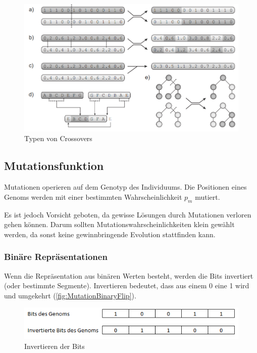         \begin{figure}[H]
          \includegraphics[width=\textwidth,center]{graphics/crossover_types}
          \caption[\protect{}, S.27]{Typen von Crossovers\label{fig:crossTypes}}
        \end{figure}

    \subsection{Mutationsfunktion~\label{sub:mutFunction}}

      Mutationen operieren auf dem Genotyp des Individuums.
      Die Positionen eines Genoms werden mit einer bestimmten Wahrscheinlichkeit \(p_{m}\) mutiert.


      Es ist jedoch Vorsicht geboten, da gewisse Lösungen durch Mutationen verloren gehen können.
      Darum sollten Mutationswahrscheinlichkeiten klein gewählt werden,
      da sonst keine gewinnbringende Evolution stattfinden kann.

      \subsubsection{Binäre Repräsentationen}

        Wenn die Repräsentation aus binären Werten besteht, werden die Bits invertiert (oder bestimmte Segmente).
        Invertieren bedeutet, dass aus einem 0 eine 1 wird und umgekehrt (\vref{fig:MutationBinaryFlip}).

        \begin{figure}[H]
          \includegraphics[scale=1,center]{graphics/mutation_binary_flip}
          \caption{Invertieren der Bits\label{fig:MutationBinaryFlip}}
        \end{figure}

